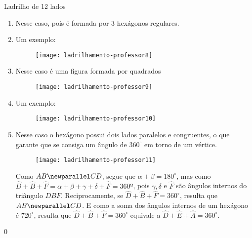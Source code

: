 \begin{answer}{Ladrilho de 12 lados}
{
	\begin{enumerate}
	\item Nesse caso, pois é formada por 3 hexágonos regulares.
	\item Um exemplo:
	\begin{figure}[H]
	\centering
	
	\texttt{[image: ladrilhamento-professor8]}
	\end{figure}
	\item Nesse caso é uma figura formada por quadrados
	{
	\begin{figure}[H]
	\centering
	
	\texttt{[image: ladrilhamento-professor9]}
	\end{figure}
	}
	\item Um exemplo:
	{
	\begin{figure}[H]
	\centering
	
	\texttt{[image: ladrilhamento-professor10]}
	\end{figure}
	}
	\clearpage
	\item Nesse caso o hexágono possui dois lados paralelos e congruentes, o que garante que se consiga um ângulo de $360^{\circ}$ em torno de um vértice.
	\begin{figure}[H]
	\centering
	
	\texttt{[image: ladrilhamento-professor11]}
	\end{figure}

	Como $AB\newparallel CD$, segue que $\alpha+\beta=180^{\circ}$, mas como $\hat{D}+\hat{B}+\hat{F}=\alpha+\beta+\gamma+\delta+\hat{F}= 360º$, pois $\gamma,\delta$ e $\hat{F}$ são ângulos internos do triângulo $DBF$. Reciprocamente, se $\hat{D}+\hat{B}+\hat{F}=360^{\circ}$, resulta que $AB \newparallel CD$.
	E como a soma dos ângulos internos de um hexágono é $720^{\circ}$, resulta que  $\hat{D}+\hat{B}+\hat{F}=360^{\circ}$ equivale a  $\hat{D}+\hat{E}+\hat{A} = 360^{\circ}$.
	\end{enumerate}
}{0}
\end{answer}


